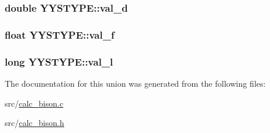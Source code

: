 \subsubsection[{val\+\_\+d}]{\setlength{\rightskip}{0pt plus 5cm}double Y\+Y\+S\+T\+Y\+P\+E\+::val\+\_\+d}\label{unionYYSTYPE_a61bc717a8d5bde0979541eb670984140}
\hypertarget{unionYYSTYPE_a6f4050b34641ae09204f63c853cb4c92}{}
\subsubsection[{val\+\_\+f}]{\setlength{\rightskip}{0pt plus 5cm}float Y\+Y\+S\+T\+Y\+P\+E\+::val\+\_\+f}\label{unionYYSTYPE_a6f4050b34641ae09204f63c853cb4c92}
\hypertarget{unionYYSTYPE_a81f209066080f5ffa329c1772b8b70c5}{}
\subsubsection[{val\+\_\+l}]{\setlength{\rightskip}{0pt plus 5cm}long Y\+Y\+S\+T\+Y\+P\+E\+::val\+\_\+l}\label{unionYYSTYPE_a81f209066080f5ffa329c1772b8b70c5}


The documentation for this union was generated from the following files\+:\begin{DoxyCompactItemize}
\item 
src/\hyperlink{calc__bison_8c}{calc\+\_\+bison.\+c}\item 
src/\hyperlink{calc__bison_8h}{calc\+\_\+bison.\+h}\end{DoxyCompactItemize}
